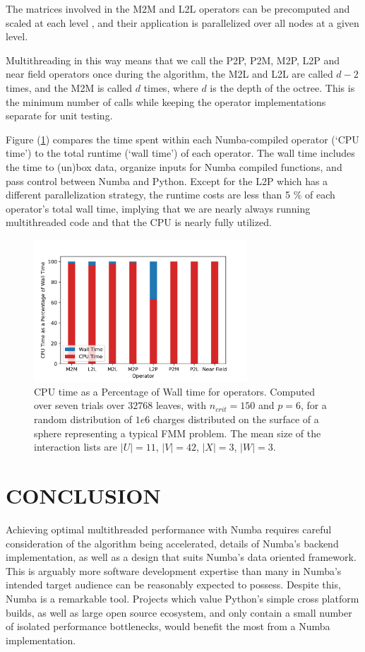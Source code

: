 \documentclass{IEEEcsmag}
\begin{document}
The matrices involved in the M2M and L2L operators can be precomputed and scaled at each level \cite{Wang2021}, and their application is parallelized over all nodes at a given level.

Multithreading in this way means that we call the P2P, P2M, M2P, L2P and near field operators once during the algorithm, the M2L and L2L are called $d-2$ times, and the M2M is called $d$ times, where $d$ is the depth of the octree. This is the minimum number of calls while keeping the operator implementations separate for unit testing.

Figure (\ref{fig:cpu_wall}) compares the time spent within each Numba-compiled operator (`CPU time') to the total runtime (`wall time') of each operator. The wall time includes the time to (un)box data, organize inputs for Numba compiled functions, and pass control between Numba and Python. Except for the L2P which has a different parallelization strategy, the runtime costs are less than 5 \% of each operator's total wall time, implying that we are nearly always running multithreaded code and that the CPU is nearly fully utilized. 

 \begin{figure}
	\centerline{\includegraphics[width=8cm]{figures/cpu_wall.png}}
    \caption{CPU time as a Percentage of Wall time for operators. Computed over seven trials over $32768$ leaves, with $n_{crit}=150$ and $p=6$, for a random distribution of $1e6$ charges distributed on the surface of a sphere representing a typical FMM problem. The mean size of the interaction lists are $|U|=11$, $|V|=42$, $|X|=3$, $|W|=3$.} 
	\label{fig:cpu_wall}
\end{figure}

\section{CONCLUSION}

Achieving optimal multithreaded performance with Numba requires careful consideration of the algorithm being accelerated, details of Numba's backend implementation, as well as a design that suits Numba's data oriented framework. This is arguably more software development expertise than many in Numba's intended target audience can be reasonably expected to possess. Despite this, Numba is a remarkable tool. Projects which value Python's simple cross platform builds, as well as large open source ecosystem, and only contain a small number of isolated performance bottlenecks, would benefit the most from a Numba implementation.
\end{document}
